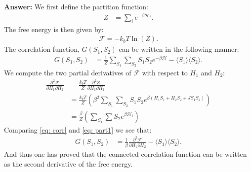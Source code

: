 \documentclass[a4paper]{article}
\newcommand{\newparagraph}{\vspace{.5cm}\noindent}
\newcommand{\average}[1]{\langle #1 \rangle}
\begin{document}
\newparagraph
\textbf{Answer:} We first define the partition function:
\begin{align*}
    Z &= \sum_i e^{-\beta \mathcal{H}_i}.
\end{align*}The free energy is then given by:
\begin{align*}
    \mathcal{F} = -k_b T\ln(Z).
\end{align*}The correlation function, $G(S_1, S_2)$ can be written in the following manner:
\begin{align}
    G(S_1, S_2) &= \frac{1}{Z}\sum_{S_1}\sum_{S_2}S_1S_2e^{-\beta \mathcal{H}} - \average{S_1}\average{S_2}.\label{eq: corr}
\end{align}We compute the two partial derivatives of $\mathcal{F}$ with respect to $H_1$ and $H_2$:
\begin{align}
    \frac{\partial^2\mathcal{F}}{\partial H_1\partial H_2} &= \frac{k_bT}{Z}\frac{\partial^2 Z}{\partial H_1\partial H_2}\nonumber\\
    &= \frac{k_bT}{Z}\left(\beta^2\sum_{S_1}\sum_{S_2}S_1S_2e^{\beta(H_1S_1 + H_2S_2 + JS_1S_2)}\right)\nonumber\\
    &= \frac{\beta}{Z} \left(\sum_{S_1}\sum{S_2}e^{\beta\mathcal{H}_i}\right)\label{eq: part1}
\end{align}Comparing \eqref{eq: corr} and \eqref{eq: part1} we see that:
\begin{align*}
    G(S_1, S_2) &= \frac{1}{\beta}\frac{\partial^2\mathcal{F}}{\partial H_1\partial H_2} - \average{S_1}\average{S_2}.
\end{align*}And thus one has proved that the connected correlation function can be written as the second derivative of the free energy.
\end{document}
